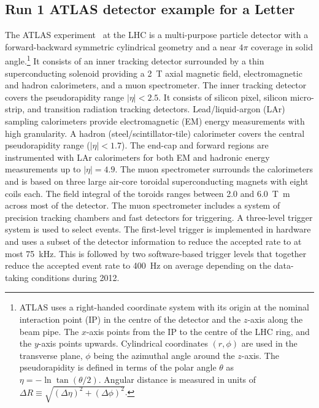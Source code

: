 \newcommand{\AtlasCoordFootnote}{%
ATLAS uses a right-handed coordinate system with its origin at the nominal interaction point (IP)
in the centre of the detector and the \(z\)-axis along the beam pipe.
The \(x\)-axis points from the IP to the centre of the LHC ring,
and the \(y\)-axis points upwards.
Cylindrical coordinates \((r,\phi)\) are used in the transverse plane, 
\(\phi\) being the azimuthal angle around the \(z\)-axis.
The pseudorapidity is defined in terms of the polar angle \(\theta\) as \(\eta = -\ln \tan(\theta/2)\).
Angular distance is measured in units of \(\Delta R \equiv \sqrt{(\Delta\eta)^{2} + (\Delta\phi)^{2}}\).}

\subsection{Run 1 ATLAS detector example for a Letter}
\label{sec:atlas1}

The ATLAS experiment~\cite{PERF-2007-01} at the LHC is a multi-purpose particle detector
with a forward-backward symmetric cylindrical geometry and a near \(4\pi\) coverage in 
solid angle.\footnote{\AtlasCoordFootnote}
It consists of an inner tracking detector surrounded by a thin superconducting solenoid
providing a \SI{2}{\tesla} axial magnetic field, electromagnetic and hadron calorimeters, and a muon spectrometer.
The inner tracking detector covers the pseudorapidity range \(|\eta| < 2.5\).
It consists of silicon pixel, silicon micro-strip, and transition radiation tracking detectors.
Lead/liquid-argon (LAr) sampling calorimeters provide electromagnetic (EM) energy measurements
with high granularity.
A hadron (steel/scintillator-tile) calorimeter covers the central pseudorapidity range (\(|\eta| < 1.7\)).
The end-cap and forward regions are instrumented with LAr calorimeters
for both EM and hadronic energy measurements up to \(|\eta| = 4.9\).
The muon spectrometer surrounds the calorimeters and is based on
three large air-core toroidal superconducting magnets with eight coils each.
The field integral of the toroids ranges between \num{2.0} and \SI{6.0}{\tesla\metre}
across most of the detector. 
The muon spectrometer includes a system of precision tracking chambers and fast detectors for triggering.
A three-level trigger system is used to select events.
The first-level trigger is implemented in hardware and uses a subset of the detector information
to reduce the accepted rate to at most \SI{75}{\kilo\hertz}.
This is followed by two software-based trigger levels that
together reduce the accepted event rate to \SI{400}{\hertz} on average
depending on the data-taking conditions during 2012.


